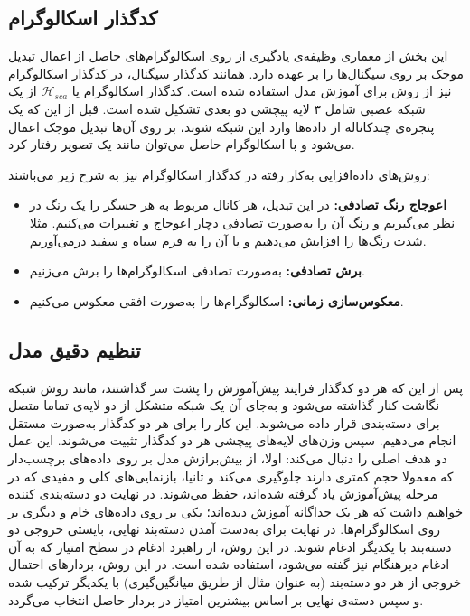 \subsection{کدگذار اسکالوگرام}

این بخش از معماری وظیفه‌ی یادگیری از روی اسکالوگرام‌های حاصل از اعمال تبدیل موجک بر روی سیگنال‌ها را بر عهده دارد. همانند کدگذار سیگنال، در کدگذار اسکالوگرام نیز از روش 
برای آموزش مدل استفاده شده است. کدگذار اسکالوگرام یا
$\mathcal{H}_{sca}$
از یک شبکه عصبی شامل ۳ لایه پیچشی دو بعدی تشکیل شده است. قبل از این که یک پنجره‌ی چندکاناله از داده‌ها وارد این شبکه شوند، بر روی آن‌ها تبدیل موجک اعمال می‌شود و با اسکالوگرام حاصل می‌توان مانند یک تصویر رفتار کرد.

روش‌های داده‌افزایی به‌کار رفته در کدگذار اسکالوگرام نیز به شرح زیر می‌باشند:
\begin{itemize}
    \item\textbf{اعوجاج رنگ تصادفی:}
    در این تبدیل، هر کانال مربوط به هر حسگر را یک رنگ در نظر می‌گیریم و رنگ آن را به‌صورت تصادفی دچار اعوجاج و تغییرات می‌کنیم. مثلا شدت رنگ‌ها را افزایش می‌دهیم و یا آن را به فرم سیاه و سفید درمی‌آوریم.
    \item\textbf{برش تصادفی:}
    به‌صورت تصادفی اسکالوگرام‌ها را برش می‌زنیم.
    \item\textbf{معکوس‌سازی زمانی:}
    اسکالوگرام‌ها را به‌صورت افقی معکوس می‌کنیم.
\end{itemize}

\subsection{تنظیم دقیق مدل}

پس از این که هر دو کدگذار فرایند پیش‌آموزش را پشت سر گذاشتند، مانند روش 
شبکه نگاشت کنار گذاشته می‌شود و به‌جای آن یک شبکه متشکل از دو لایه‌ی تماما متصل برای دسته‌بندی قرار داده می‌شوند. این کار را برای هر دو کدگذار به‌صورت مستقل انجام می‌دهیم. سپس وزن‌های لایه‌های پیچشی هر دو کدگذار تثبیت می‌شوند. این عمل دو هدف اصلی را دنبال می‌کند: اولا، از بیش‌برازش مدل بر روی داده‌های برچسب‌دار که معمولا حجم کمتری دارند جلوگیری می‌کند و ثانیا، بازنمایی‌های کلی و مفیدی که در مرحله پیش‌آموزش یاد گرفته شده‌اند، حفظ می‌شوند. در نهایت دو دسته‌بندی کننده خواهیم داشت که هر یک جداگانه آموزش دیده‌اند؛ یکی بر روی داده‌های خام و دیگری بر روی اسکالوگرام‌ها. در نهایت برای به‌دست آمدن دسته‌بند نهایی، بایستی خروجی دو دسته‌بند با یکدیگر ادغام شوند. در این روش، از راهبرد
ادغام در سطح امتیاز
که به آن
ادغام دیرهنگام
نیز گفته می‌شود، استفاده شده است. در این روش، بردارهای احتمال خروجی از هر دو دسته‌بند (به عنوان مثال از طریق میانگین‌گیری) با یکدیگر ترکیب شده و سپس دسته‌ی نهایی بر اساس بیشترین امتیاز در بردار حاصل انتخاب می‌گردد.

